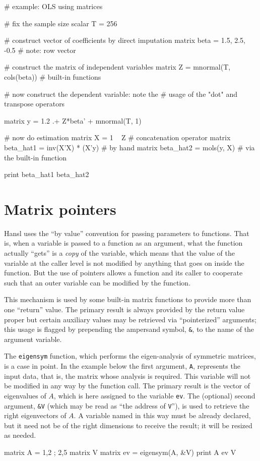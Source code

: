 \begin{code}
# example: OLS using matrices

# fix the sample size
scalar T = 256

# construct vector of coefficients by direct imputation
matrix beta = {1.5, 2.5, -0.5} # note: row vector

# construct the matrix of independent variables
matrix Z = mnormal(T, cols(beta)) # built-in functions

# now construct the dependent variable: note the
# usage of the "dot" and transpose operators

matrix y = {1.2} .+ Z*beta' + mnormal(T, 1)

# now do estimation
matrix X = 1 ~ Z  # concatenation operator
matrix beta_hat1 = inv(X'X) * (X'y) # by hand
matrix beta_hat2 = mols(y, X)       # via the built-in function

print beta_hat1 beta_hat2
\end{code}

\section{Matrix pointers}
\label{sec:mat-pointers}

Hansl uses the ``by value'' convention for passing parameters to
functions. That is, when a variable is passed to a function as an
argument, what the function actually ``gets'' is a \emph{copy} of the
variable, which means that the value of the variable at the caller
level is not modified by anything that goes on inside the function.
But the use of pointers allows a function and its caller to cooperate
such that an outer variable can be modified by the function.

This mechanism is used by some built-in matrix functions to provide
more than one ``return'' value. The primary result is always provided
by the return value proper but certain auxiliary values may be
retrieved via ``pointerized'' arguments; this usage is flagged by
prepending the ampersand symbol, \texttt{\&}, to the name of the
argument variable.

The \texttt{eigensym} function, which performs the eigen-analysis of
symmetric matrices, is a case in point. In the example below the first
argument, \texttt{A}, represents the input data, that is, the matrix
whose analysis is required. This variable will not be modified in any
way by the function call. The primary result is the vector of
eigenvalues of $A$, which is here assigned to the variable
\texttt{ev}. The (optional) second argument, \texttt{\&V} (which may
be read as ``the address of \texttt{V}''), is used to retrieve the
right eigenvectors of $A$. A variable named in this way must be
already declared, but it need not be of the right dimensions to
receive the result; it will be resized as needed.
\begin{code}
matrix A = {1,2 ; 2,5}
matrix V
matrix ev = eigensym(A, &V)
print A ev V
\end{code}

